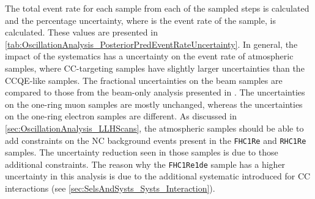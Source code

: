 The total event rate for each sample from each of the sampled steps is calculated and the percentage uncertainty,  where  is the event rate of the  sample, is calculated. These values are presented in \autoref{tab:OscillationAnalysis_PosteriorPredEventRateUncertainty}. In general, the impact of the systematics has a  uncertainty on the event rate of atmospheric samples, where CC\quickmath{1\pi}-targeting samples have slightly larger uncertainties than the CCQE-like samples.
The fractional uncertainties on the beam samples are compared to those from the beam-only analysis presented in \cite{Dunne2020-uf, t2k_tn_393}. The uncertainties on the one-ring muon samples are mostly unchanged, whereas the uncertainties on the one-ring electron samples are different. As discussed in \autoref{sec:OscillationAnalysis_LLHScans}, the atmospheric samples should be able to add constraints on the NC background events present in the \texttt{FHC1Re} and \texttt{RHC1Re} samples. The uncertainty reduction seen in those samples is due to those additional constraints. The reason why the \texttt{FHC1Re1de} sample has a higher uncertainty in this analysis is due to the additional systematic introduced for CC\quickmath{1\pi} interactions (see \autoref{sec:SelsAndSysts_Systs_Interaction}).

